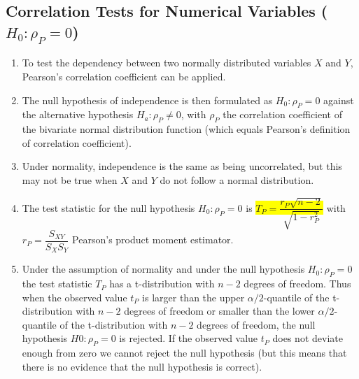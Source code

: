 \subsection{Correlation Tests for Numerical Variables ($H_0 : \rho_P = 0 $)}

\begin{enumerate}
    \item To test the dependency between two normally distributed variables $X$ and $Y $, Pearson’s correlation coefficient can be applied.
    \hfill \cite{statistics/book/Statistics-for-Data-Scientists/Maurits-Kaptein}

    \item The null hypothesis of independence is then formulated as $H_0 : \rho_P = 0$ against the alternative hypothesis $H_a : \rho_P \neq 0$, with $\rho_P$ the correlation coefficient of the bivariate normal distribution function (which equals Pearson’s definition of correlation coefficient).
    \hfill \cite{statistics/book/Statistics-for-Data-Scientists/Maurits-Kaptein}

    \item Under normality, independence is the same as being uncorrelated, but this may not be true when $X$ and $Y$ do not follow a normal distribution.
    \hfill \cite{statistics/book/Statistics-for-Data-Scientists/Maurits-Kaptein}

    \item The test statistic for the null hypothesis $H_0 : \rho_P = 0$ is \colorbox{yellow}{$T _P = \dfrac{r _P \sqrt{n - 2}}{\sqrt{1 - r^2_P}}$} with $r_ P = \dfrac{S _{X Y}}{S_ X S_Y}$ Pearson’s product moment estimator.
    \hfill \cite{statistics/book/Statistics-for-Data-Scientists/Maurits-Kaptein}

    \item Under the assumption of normality and under the null hypothesis $H_0 : \rho_P = 0$ the test statistic $T _P$ has a t-distribution with $n - 2$ degrees of freedom. 
    Thus when the observed value $t _P$ is larger than the upper $\alpha/2$-quantile of the t-distribution with $n - 2$ degrees of freedom or smaller than the lower $\alpha/2$-quantile of the t-distribution with $n - 2$ degrees of freedom, the null hypothesis $H0 : \rho_P = 0$ is rejected. 
    If the observed value $t _P$ does not deviate enough from zero we cannot reject the null hypothesis (but this means that there is no evidence that the null hypothesis is correct).
    \hfill \cite{statistics/book/Statistics-for-Data-Scientists/Maurits-Kaptein}


\end{enumerate}
